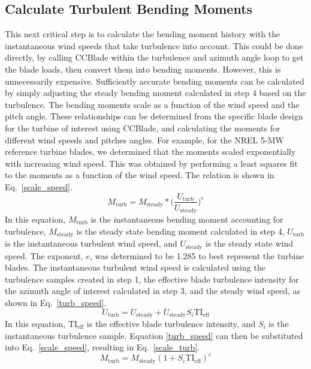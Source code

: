 \documentclass[11pt,letterpaper]{article}
\begin{document}
\subsection{Calculate Turbulent Bending Moments}
This next critical step is to calculate the bending moment history with the instantaneous wind speeds that take turbulence into account. This could be done directly, by calling CCBlade within the turbulence and azimuth angle loop to get the blade loads, then convert them into bending moments. However, this is unnecessarily expensive. Sufficiently accurate bending moments can be calculated by simply adjusting the steady bending moment calculated in step 4 based on the turbulence. The bending moments scale as a function of the wind speed and the pitch angle. These relationships can be determined from the specific blade design for the turbine of interest using CCBlade, and calculating the moments for different wind speeds and pitches angles. For example, for the NREL 5-MW reference turbine blades, we determined that the moments scaled exponentially with increasing wind speed. This was obtained by performing a least squares fit to the moments as a function of the wind speed. The relation is shown in Eq.~\ref{scale_speed}.
% 
\begin{equation}
    M_\text{turb} = M_{\text{steady}}*\Big(\frac{U_\text{turb}}{U_\text{steady}}\Big)^e
    \label{scale_speed}
\end{equation}
% 
In this equation, $M_\text{turb}$ is the instantaneous bending moment accounting for turbulence, $M_{\text{steady}}$ is the steady state bending moment calculated in step 4, $U_\text{turb}$ is the instantaneous turbulent wind speed, and ${U_\text{steady}}$ is the steady state wind speed. The exponent, $e$, was determined to be 1.285 to best represent the turbine blades. The instantaneous turbulent wind speed is calculated using the turbulence samples created in step 1, the effective blade turbulence intensity for the azimuth angle of interest calculated in step 3, and the steady wind speed, as shown in Eq.~\ref{turb_speed}.
% 
\begin{equation}
    U_\text{turb} = U_\text{steady} + U_\text{steady} S_i \text{TI}_{\text{eff}}
    \label{turb_speed}
\end{equation}
% 
In this equation, $\text{TI}_{\text{eff}}$ is the effective blade turbulence intensity, and $S_i$ is the instantaneous turbulence sample. Equation \ref{turb_speed} can then be substituted into Eq.~\ref{scale_speed}, resulting in Eq.~\ref{scale_turb}.
% 
\begin{equation}
    M_\text{turb} = M_{\text{steady}} (1+ S_i \text{TI}_{\text{eff}})^e
    \label{scale_turb}
\end{equation}
\end{document}
